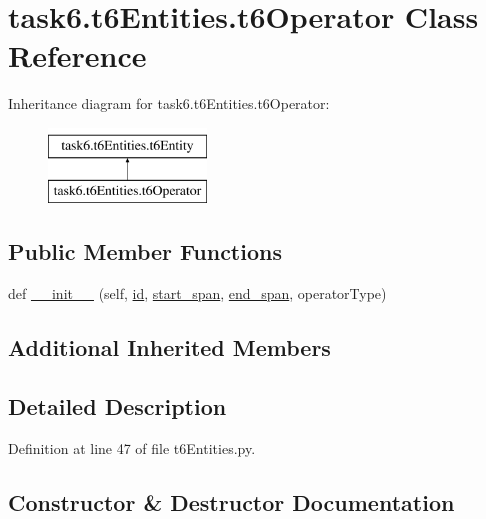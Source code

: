 \hypertarget{classtask6_1_1t6Entities_1_1t6Operator}{}\section{task6.\+t6\+Entities.\+t6\+Operator Class Reference}
\label{classtask6_1_1t6Entities_1_1t6Operator}
Inheritance diagram for task6.\+t6\+Entities.\+t6\+Operator\+:\begin{figure}[H]
\begin{center}
\leavevmode
\includegraphics[height=2.000000cm]{classtask6_1_1t6Entities_1_1t6Operator}
\end{center}
\end{figure}
\subsection*{Public Member Functions}
\begin{DoxyCompactItemize}
\item 
def \hyperlink{classtask6_1_1t6Entities_1_1t6Operator_a742bafc1cb775d74ee2be13f8c880472}{\+\_\+\+\_\+init\+\_\+\+\_\+} (self, \hyperlink{classtask6_1_1t6Entities_1_1t6Entity_a96b2e7fb553c920ab2db6f6deb31e3b4}{id}, \hyperlink{classtask6_1_1t6Entities_1_1t6Entity_a8221c36d2995a24200cdfbd74cc9233c}{start\+\_\+span}, \hyperlink{classtask6_1_1t6Entities_1_1t6Entity_a597d42bb02fc9f42277098f0ce21917c}{end\+\_\+span}, operator\+Type)
\end{DoxyCompactItemize}
\subsection*{Additional Inherited Members}


\subsection{Detailed Description}


Definition at line 47 of file t6\+Entities.\+py.



\subsection{Constructor \& Destructor Documentation}
\mbox{\label{classtask6_1_1t6Entities_1_1t6Operator_a742bafc1cb775d74ee2be13f8c880472}} 
